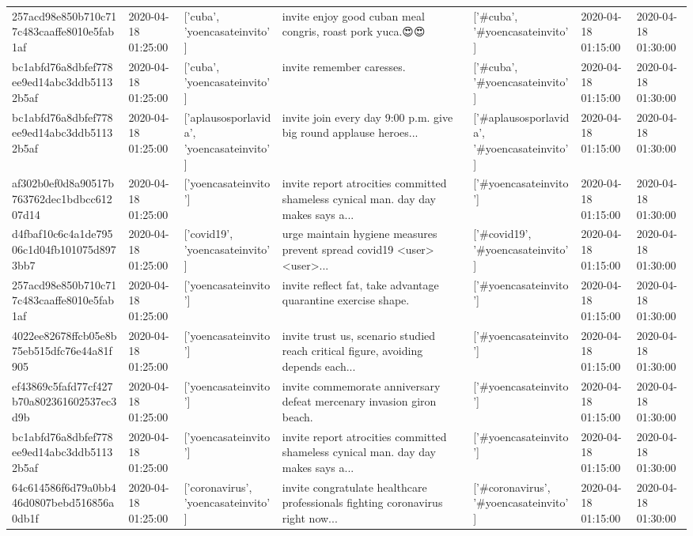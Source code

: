 \begin{tabular}{lllllll}
257acd98e850b710c717c483caaffe8010e5fab1af & 2020-04-18 01:25:00 & ['cuba', 'yoencasateinvito'] & invite enjoy good cuban meal congris, roast pork yuca.😍😍 & ['#cuba', '#yoencasateinvito'] & 2020-04-18 01:15:00 & 2020-04-18 01:30:00 \\
bc1abfd76a8dbfef778ee9ed14abc3ddb51132b5af & 2020-04-18 01:25:00 & ['cuba', 'yoencasateinvito'] & invite remember caresses. & ['#cuba', '#yoencasateinvito'] & 2020-04-18 01:15:00 & 2020-04-18 01:30:00 \\
bc1abfd76a8dbfef778ee9ed14abc3ddb51132b5af & 2020-04-18 01:25:00 & ['aplausosporlavida', 'yoencasateinvito'] & invite join every day 9:00 p.m. give big round applause heroes... & ['#aplausosporlavida', '#yoencasateinvito'] & 2020-04-18 01:15:00 & 2020-04-18 01:30:00 \\
af302b0ef0d8a90517b763762dec1bdbcc61207d14 & 2020-04-18 01:25:00 & ['yoencasateinvito'] & invite report atrocities committed shameless cynical man. day day makes says a... & ['#yoencasateinvito'] & 2020-04-18 01:15:00 & 2020-04-18 01:30:00 \\
d4fbaf10c6c4a1de79506c1d04fb101075d8973bb7 & 2020-04-18 01:25:00 & ['covid19', 'yoencasateinvito'] & urge maintain hygiene measures prevent spread covid19 <user> <user>... & ['#covid19', '#yoencasateinvito'] & 2020-04-18 01:15:00 & 2020-04-18 01:30:00 \\
257acd98e850b710c717c483caaffe8010e5fab1af & 2020-04-18 01:25:00 & ['yoencasateinvito'] & invite reflect fat, take advantage quarantine exercise shape. & ['#yoencasateinvito'] & 2020-04-18 01:15:00 & 2020-04-18 01:30:00 \\
4022ee82678ffcb05e8b75eb515dfc76e44a81f905 & 2020-04-18 01:25:00 & ['yoencasateinvito'] & invite trust us, scenario studied reach critical figure, avoiding depends each... & ['#yoencasateinvito'] & 2020-04-18 01:15:00 & 2020-04-18 01:30:00 \\
ef43869c5fafd77cf427b70a802361602537ec3d9b & 2020-04-18 01:25:00 & ['yoencasateinvito'] & invite commemorate anniversary defeat mercenary invasion giron beach. & ['#yoencasateinvito'] & 2020-04-18 01:15:00 & 2020-04-18 01:30:00 \\
bc1abfd76a8dbfef778ee9ed14abc3ddb51132b5af & 2020-04-18 01:25:00 & ['yoencasateinvito'] & invite report atrocities committed shameless cynical man. day day makes says a... & ['#yoencasateinvito'] & 2020-04-18 01:15:00 & 2020-04-18 01:30:00 \\
64c614586f6d79a0bb446d0807bebd516856a0db1f & 2020-04-18 01:25:00 & ['coronavirus', 'yoencasateinvito'] & invite congratulate healthcare professionals fighting coronavirus right now... & ['#coronavirus', '#yoencasateinvito'] & 2020-04-18 01:15:00 & 2020-04-18 01:30:00 \\

\end{tabular}
